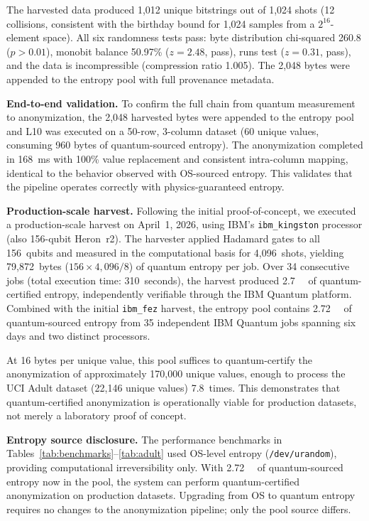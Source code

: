 \documentclass[journal]{IEEEtran}
\begin{document}
The harvested data produced 1,012 unique bitstrings out of 1,024 shots (12 collisions, consistent with the birthday bound for 1,024 samples from a $2^{16}$-element space). All six randomness tests pass: byte distribution chi-squared 260.8 ($p > 0.01$), monobit balance 50.97\% ($z = 2.48$, pass), runs test ($z = 0.31$, pass), and the data is incompressible (compression ratio 1.005). The 2,048 bytes were appended to the entropy pool with full provenance metadata.

\textbf{End-to-end validation.} To confirm the full chain from quantum measurement to anonymization, the 2,048 harvested bytes were appended to the entropy pool and L10 was executed on a 50-row, 3-column dataset (60 unique values, consuming 960 bytes of quantum-sourced entropy). The anonymization completed in 168~ms with 100\% value replacement and consistent intra-column mapping, identical to the behavior observed with OS-sourced entropy. This validates that the pipeline operates correctly with physics-guaranteed entropy.

\textbf{Production-scale harvest.} Following the initial proof-of-concept, we executed a production-scale harvest on April~1, 2026, using IBM's \texttt{ibm\_kingston} processor (also 156-qubit Heron~r2). The harvester applied Hadamard gates to all 156~qubits and measured in the computational basis for 4,096~shots, yielding 79,872~bytes ($156 \times 4{,}096 / 8$) of quantum entropy per job. Over 34 consecutive jobs (total execution time: 310~seconds), the harvest produced \SI{2.7}{\mega\byte} of quantum-certified entropy, independently verifiable through the IBM Quantum platform. Combined with the initial \texttt{ibm\_fez} harvest, the entropy pool contains \SI{2.72}{\mega\byte} of quantum-sourced entropy from 35 independent IBM Quantum jobs spanning six days and two distinct processors.

At 16 bytes per unique value, this pool suffices to quantum-certify the anonymization of approximately 170,000 unique values, enough to process the UCI Adult dataset (22,146 unique values) 7.8~times. This demonstrates that quantum-certified anonymization is operationally viable for production datasets, not merely a laboratory proof of concept.

\textbf{Entropy source disclosure.} The performance benchmarks in Tables~\ref{tab:benchmarks}--\ref{tab:adult} used OS-level entropy (\texttt{/dev/urandom}), providing computational irreversibility only. With \SI{2.72}{\mega\byte} of quantum-sourced entropy now in the pool, the system can perform quantum-certified anonymization on production datasets. Upgrading from OS to quantum entropy requires no changes to the anonymization pipeline; only the pool source differs.
\end{document}
